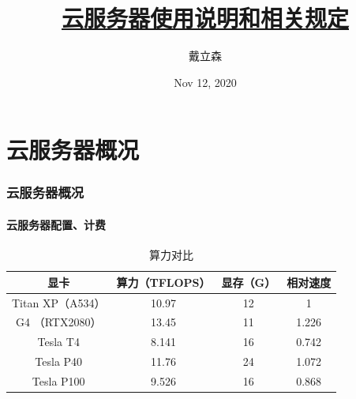 \documentclass[10pt]{beamer}
\title{
    \href{https://github.com/Ls-Dai/Cloud-Sever-Tutorial}{云服务器使用说明和相关规定}
}
\author{戴立森}
\date{Nov 12, 2020}
\begin{document}
    \maketitle
    \hypersetup{colorlinks,linkcolor=yellow,urlcolor=yellow}

    \section{云服务器概况}
        \begin{frame}
            \frametitle{云服务器概况}
                \framesubtitle{云服务器配置、计费}

                {\small
                \begin{table}[h]
                    \centering
                    \caption{算力对比}
                        \begin{tabular}{|c|c|c|c|}
                            \hline
                            显卡 & 算力（TFLOPS） & 显存（G） & 相对速度 \\
                            \hline
                            Titan XP（A534） & 10.97 & 12 & 1 \\
                            \hline
                            G4 （RTX2080） & 13.45 & 11 & 1.226 \\
                            \hline
                            Tesla T4 & 8.141 & 16 & 0.742 \\
                            \hline
                            Tesla P40 & 11.76 & 24 & 1.072 \\
                            \hline
                            Tesla P100 & 9.526 & 16 & 0.868 \\
                            \hline
                        \end{tabular}
                \end{table}
                }

        \end{frame}

        \hypersetup{colorlinks,linkcolor=yellow,urlcolor=blue}
\end{document}
